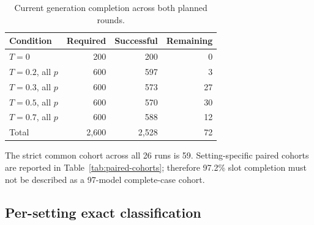 \documentclass[11pt,a4paper]{article}
\begin{document}
\begin{table}[ht]
\centering
\caption{Current generation completion across both planned rounds.}
\begin{tabular}{lrrr}
\toprule
Condition & Required & Successful & Remaining \\
\midrule
$T=0$ & 200 & 200 & 0 \\
$T=0.2$, all $p$ & 600 & 597 & 3 \\
$T=0.3$, all $p$ & 600 & 573 & 27 \\
$T=0.5$, all $p$ & 600 & 570 & 30 \\
$T=0.7$, all $p$ & 600 & 588 & 12 \\
\midrule
Total & 2,600 & 2,528 & 72 \\
\bottomrule
\end{tabular}
\end{table}

The strict common cohort across all 26 runs is 59. Setting-specific paired
cohorts are reported in Table~\ref{tab:paired-cohorts}; therefore 97.2\% slot
completion must not be described as a 97-model complete-case cohort.

\subsection{Per-setting exact classification}
\end{document}
